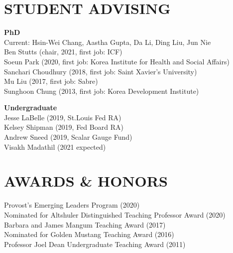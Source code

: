 \documentclass[11pt]{res}
\begin{document}
\begin{resume}
\section{STUDENT ADVISING} \vspace{1.5mm}
\textbf{PhD}\vspace{1.5mm}\\
Current: Hsin-Wei Chang, Aastha Gupta, Da Li, Ding Liu, Jun Nie\vspace{1.5mm}\\
Ben Stutts (chair, 2021, first job: ICF)\vspace{1.5mm}\\
Soeun Park (2020, first job: Korea Institute for Health and Social Affairs)\vspace{1.5mm}\\
Sanchari Choudhury (2018, first job: Saint Xavier's University)\vspace{1.5mm}\\
Mu Liu (2017, first job: Sabre)\vspace{1.5mm}\\
Sunghoon Chung (2013, first job: Korea Development Institute)

\textbf{Undergraduate}\vspace{1.5mm}\\
Jesse LaBelle (2019, St.Louis Fed RA)\vspace{1.5mm}\\
Kelsey Shipman (2019, Fed Board RA)\vspace{1.5mm}\\
Andrew Sneed (2019, Scalar Gauge Fund)\vspace{1.5mm}\\
Visakh Madathil (2021 expected)

\section{AWARDS \& HONORS} \vspace{1.5mm}
Provost's Emerging Leaders Program (2020)\vspace{1.5mm}\\
Nominated for Altshuler Distinguished Teaching Professor Award (2020)\vspace{1.5mm}\\
Barbara and James Mangum Teaching Award (2017)\vspace{1.5mm}\\
Nominated for Golden Mustang Teaching Award (2016)\vspace{1.5mm}\\
Professor Joel Dean Undergraduate Teaching Award (2011)


\end{resume}
\end{document}
